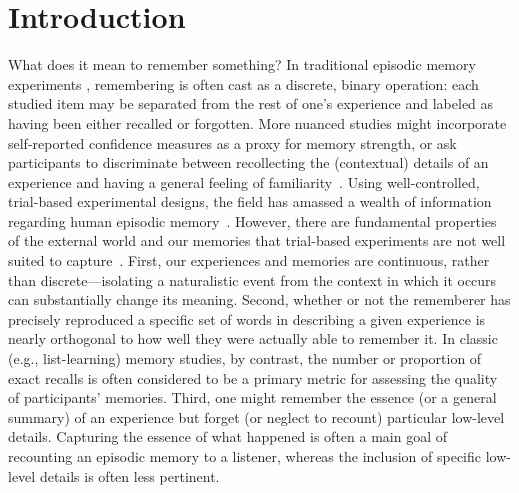 \documentclass[10pt]{article}
\begin{document}
\section*{Introduction}
What does it mean to remember something? In traditional episodic memory experiments \citep[e.g., list-learning or trial-based experiments;][]{Murd62a, Kaha96}, remembering is often cast as a discrete, binary operation: each studied item may be separated from the rest of one's experience and labeled as having been either recalled or forgotten. More nuanced studies might incorporate self-reported confidence measures as a proxy for memory strength, or ask participants to discriminate between recollecting the (contextual) details of an experience and having a general feeling of familiarity~\citep{Yone02}. Using well-controlled, trial-based experimental designs, the field has amassed a wealth of information regarding human episodic memory~\citep[for review see][]{Kaha12}.  However, there are fundamental properties of the external world and our memories that trial-based experiments are not well suited to capture~\citep[for review, also see][]{KoriGold94, HukEtal18}.  First, our experiences and memories are continuous, rather than discrete---isolating a naturalistic event from the context in which it occurs can substantially change its meaning.  Second, whether or not the rememberer has precisely reproduced a specific set of words in describing a given experience is nearly orthogonal to how well they were actually able to remember it.  In classic (e.g., list-learning) memory studies, by contrast, the number or proportion of exact recalls is often considered to be a primary metric for assessing the quality of participants' memories.  Third, one might remember the essence (or a general summary) of an experience but forget (or neglect to recount) particular low-level details.  Capturing the essence of what happened is often a main goal of recounting an episodic memory to a listener, whereas the inclusion of specific low-level details is often less pertinent.
\end{document}
